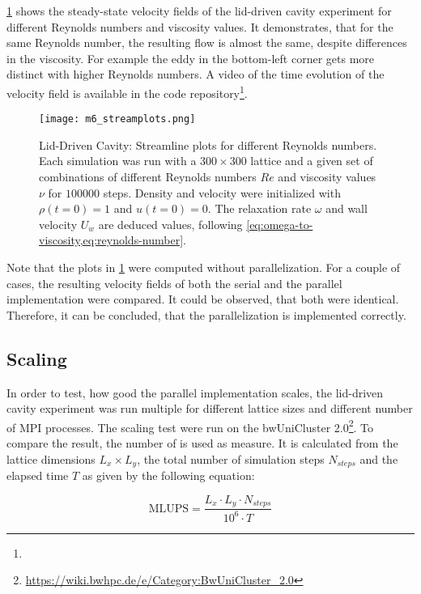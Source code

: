 \cref{fig:lid:streamplots} shows the steady-state velocity fields of the lid-driven cavity experiment for different Reynolds numbers and viscosity values. It demonstrates, that for the same Reynolds number, the resulting flow is almost the same, despite differences in the viscosity. For example the eddy in the bottom-left corner gets more distinct with higher Reynolds numbers. A video of the time evolution of the velocity field is available in the code repository\footnote{\therepository}.

\begin{figure}[htp]
    \texttt{[image: m6\_streamplots.png]}
    \caption[Lid-Driven Cavity: Streamline plots for different Reynolds numbers]{Lid-Driven Cavity: Streamline plots for different Reynolds numbers. Each simulation was run with a $300\times300$ lattice and a given set of combinations of different Reynolds numbers $Re$ and viscosity values $\nu$ for $100000$ steps. Density and velocity were initialized with $\rho(t=0)=1$ and $u(t=0)=0$. The relaxation rate $\omega$ and wall velocity $U_w$ are deduced values, following \cref{eq:omega-to-viscosity,eq:reynolds-number}.}
    \label{fig:lid:streamplots}
\end{figure}

Note that the plots in \cref{fig:lid:streamplots} were computed without parallelization. For a couple of cases, the resulting velocity fields of both the serial and the parallel implementation were compared. It could be observed, that both were identical. Therefore, it can be concluded, that the parallelization is implemented correctly.

\subsection{Scaling}

In order to test, how good the parallel implementation scales, the lid-driven cavity experiment was run multiple for different lattice sizes and different number of MPI processes. The scaling test were run on the bwUniCluster 2.0\footnote{\href{https://wiki.bwhpc.de/e/Category:BwUniCluster\_2.0}{https://wiki.bwhpc.de/e/Category:BwUniCluster\_2.0}}. To compare the result, the number of  is used as measure. It is calculated from the lattice dimensions $L_x \times L_y$, the total number of simulation steps $N_{steps}$ and the elapsed time $T$ as given by the following equation:

\begin{equation}
    \label{eq:mlups}
    \text{MLUPS} = \frac{L_x \cdot L_y \cdot N_{steps}}{10^6 \cdot T}
\end{equation}

